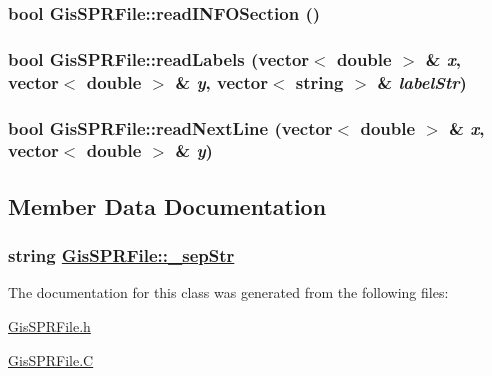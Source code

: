 \hypertarget{classGisSPRFile_a7}{
\subsubsection[readINFOSection]{\setlength{\rightskip}{0pt plus 5cm}bool Gis\-SPRFile::read\-INFOSection ()}}
\label{classGisSPRFile_a7}


\hypertarget{classGisSPRFile_a4}{
\subsubsection[readLabels]{\setlength{\rightskip}{0pt plus 5cm}bool Gis\-SPRFile::read\-Labels (vector$<$ double $>$ \& {\em x}, vector$<$ double $>$ \& {\em y}, vector$<$ string $>$ \& {\em label\-Str})}}
\label{classGisSPRFile_a4}


\hypertarget{classGisSPRFile_a6}{
\subsubsection[readNextLine]{\setlength{\rightskip}{0pt plus 5cm}bool Gis\-SPRFile::read\-Next\-Line (vector$<$ double $>$ \& {\em x}, vector$<$ double $>$ \& {\em y})}}
\label{classGisSPRFile_a6}




\subsection{Member Data Documentation}
\hypertarget{classGisSPRFile_p0}{
\subsubsection[\_\-sepStr]{\setlength{\rightskip}{0pt plus 5cm}string \hyperlink{classGisSPRFile_p0}{Gis\-SPRFile::\_\-sep\-Str}}}
\label{classGisSPRFile_p0}




The documentation for this class was generated from the following files:\begin{CompactItemize}
\item 
\hyperlink{GisSPRFile_8h}{Gis\-SPRFile.h}\item 
\hyperlink{GisSPRFile_8C}{Gis\-SPRFile.C}\end{CompactItemize}
